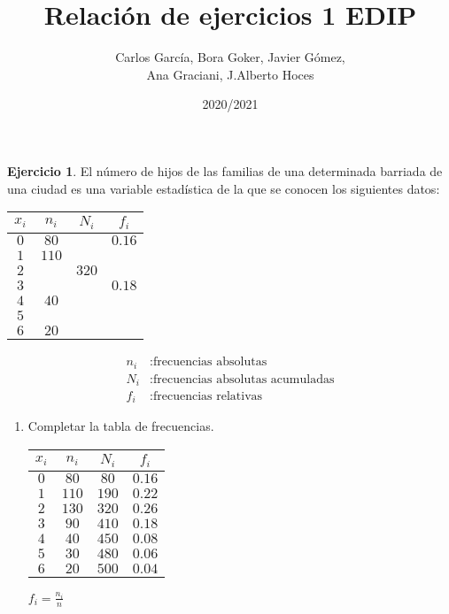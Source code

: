 \documentclass[a4paper, 12pt]{article}
\title{\textbf{Relación de ejercicios 1 EDIP}}
\author{Carlos García, Bora Goker, Javier Gómez,  \\ Ana Graciani, J.Alberto Hoces}
\date{2020/2021}
\theoremstyle{definition}
\newtheorem{ej}{Ejercicio}
\begin{document}
\maketitle

\begin{ej}
El número de hijos de las familias de una determinada barriada de una ciudad es una variable estadística de la que se conocen los siguientes datos:

\begin{table}[!h]

    \begin{tabular}{|c|c|c|c|}
    \hline
     \(x_i\) & \(n_i\) & \(N_i \) & \(f_i \)  \\ \hline
     \(0 \) & \(80 \) & & \(0.16 \)  \\ 
     \(1 \) & \(110 \) & & \\ 
     \(2 \) &  & \(320 \) &   \\ 
     \(3 \) & & & \(0.18 \)  \\ 
     \(4 \) & \(40 \) & &\\ 
     \(5 \) & & & \\ 
     \(6 \) & \(20 \) & & \\ 
     \hline
    \end{tabular}
  
\vspace*{-90pt}
    \begin{align*}
    n_i &: \text{frecuencias absolutas }\\
    N_i&: \text{frecuencias absolutas acumuladas} \\
    f_i&: \text{frecuencias relativas}
    \end{align*}
\end{table}

\begin{enumerate}[label=\textit{\alph*})]
    \item Completar la tabla de frecuencias.
    
    \begin{center}
    \begin{tabular}{|c|c|c|c|}
    \hline
     \(x_i\) & \(n_i\) & \(N_i \) & \(f_i \)  \\ \hline
     \(0 \) & \(80 \) & \color{blue} \(80 \) & \(0.16 \)  \\ 
     \(1 \) & \(110 \) & \color{blue} \(190 \) & \color{blue} \(0.22 \)\\ 
     \(2 \) & \color{blue} \(130 \)  & \(320 \) & \color{blue} \(0.26\) \\
     \(3 \) & \color{blue} \(90 \) & \color{blue} \(410 \) & \(0.18 \)  \\ 
     \(4 \) & \(40 \) & \color{blue} \(450 \) & \color{blue} \(0.08\)\\ 
     \(5 \) & \color{blue} \(30 \) & \color{blue} \(480 \) & \color{blue} \(0.06 \) \\ 
     \(6 \) & \(20 \) & \color{blue} \(500 \) & \color{blue} \(0.04 \) \\ 
     \hline
    \end{tabular}
    \qquad \(f_i = \frac{n_i}{n}\)
    \end{center}
    

\end{enumerate}
\end{ej}
\end{document}
